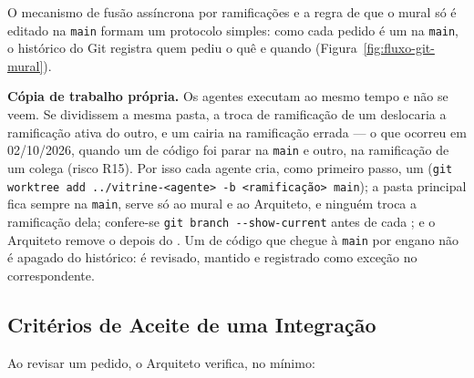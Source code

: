 
O mecanismo de fusão assíncrona por ramificações e a regra de que o mural só é editado na \texttt{main} formam um protocolo simples: como cada pedido é um  na \texttt{main}, o histórico do Git registra quem pediu o quê e quando (Figura~\ref{fig:fluxo-git-mural}).

\textbf{Cópia de trabalho própria.} Os agentes executam ao mesmo tempo e não se veem. Se dividissem a mesma pasta, a troca de ramificação de um deslocaria a ramificação ativa do outro, e um  cairia na ramificação errada --- o que ocorreu em 02/10/2026, quando um  de código foi parar na \texttt{main} e outro, na ramificação de um colega (risco R15). Por isso cada agente cria, como primeiro passo, um  (\texttt{git worktree add ../vitrine-<agente> -b <ramificação> main}); a pasta principal fica sempre na \texttt{main}, serve só ao mural e ao Arquiteto, e ninguém troca a ramificação dela; confere-se \texttt{git branch -{}-show-current} antes de cada ; e o Arquiteto remove o  depois do . Um  de código que chegue à \texttt{main} por engano não é apagado do histórico: é revisado, mantido e registrado como exceção no  correspondente.


\subsection{Critérios de Aceite de uma Integração}\label{sec:criterios-aceite}

Ao revisar um pedido, o Arquiteto verifica, no mínimo:

